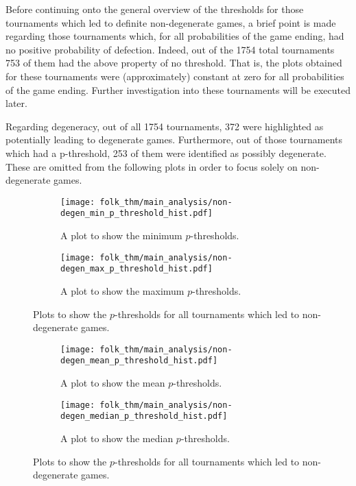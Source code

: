 Before continuing onto the general overview of the thresholds for those
tournaments which led to definite non-degenerate games, a brief point is made
regarding those tournaments which, for all probabilities of the game ending, had
no positive probability of defection. Indeed, out of the 1754 total tournaments
753 of them had the above property of no threshold. That is, the plots obtained
for these tournaments were (approximately) constant at zero for all
probabilities of the game ending. Further investigation into these tournaments
will be executed later. 

Regarding degeneracy, out of all 1754 tournaments, 372 were highlighted as
potentially leading to degenerate games. Furthermore, out of those tournaments
which had a p-threshold, 253 of them were identified as possibly degenerate.
These are omitted from the following plots in order to focus solely on
non-degenerate games.

\begin{figure}
    \begin{subfigure}{.45\textwidth}
        \centering
        \texttt{[image: folk\_thm/main\_analysis/non-degen\_min\_p\_threshold\_hist.pdf]}
        \caption{A plot to show the minimum \(p\)-thresholds.}\label{subfig:non_degen_min_p_thresh}
    \end{subfigure}
    \begin{subfigure}{.45\textwidth}
        \centering
        \texttt{[image: folk\_thm/main\_analysis/non-degen\_max\_p\_threshold\_hist.pdf]}
        \caption{A plot to show the maximum \(p\)-thresholds.}\label{subfig:non_degen_max_p_thresh}
    \end{subfigure}
    \caption{Plots to show the \(p\)-thresholds for all tournaments which led to non-degenerate games.}\label{fig:non_degen_min_max_p_thresh}
\end{figure}


\begin{figure}
    \begin{subfigure}{.45\textwidth}
        \centering
        \texttt{[image: folk\_thm/main\_analysis/non-degen\_mean\_p\_threshold\_hist.pdf]}
        \caption{A plot to show the mean \(p\)-thresholds.}\label{subfig:non_degen_mean_p_thresh}
    \end{subfigure}
    \begin{subfigure}{.45\textwidth}
        \centering
        \texttt{[image: folk\_thm/main\_analysis/non-degen\_median\_p\_threshold\_hist.pdf]}
        \caption{A plot to show the median \(p\)-thresholds.}\label{subfig:non_degen_median_p_thresh}
    \end{subfigure}
    \caption{Plots to show the \(p\)-thresholds for all tournaments which led to non-degenerate games.}\label{fig:non_degen_mean_median_p_thresh}
\end{figure}

